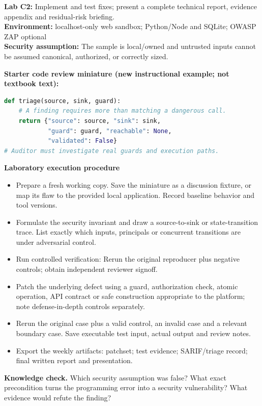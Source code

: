 \documentclass[10pt,letterpaper]{article}
\begin{document}
\begin{insight}\textbf{Lab C2:} Implement and test fixes; present a complete technical report, evidence appendix and residual-risk briefing.\\\textbf{Environment:} localhost-only web sandbox; Python/Node and SQLite; OWASP ZAP optional\\\textbf{Security assumption:} The sample is local/owned and untrusted inputs cannot be assumed canonical, authorized, or correctly sized.\end{insight}
\textbf{Starter code review miniature (new instructional example; not textbook text):}
\begin{lstlisting}[language=Python]
def triage(source, sink, guard):
    # A finding requires more than matching a dangerous call.
    return {"source": source, "sink": sink,
            "guard": guard, "reachable": None,
            "validated": False}
# Auditor must investigate real guards and execution paths.
\end{lstlisting}
\textbf{Laboratory execution procedure}
\begin{itemize}[leftmargin=*,itemsep=2pt]
\item Prepare a fresh working copy. Save the miniature as a discussion fixture, or map its flaw to the provided local application. Record baseline behavior and tool versions.
\item Formulate the security invariant and draw a source-to-sink or state-transition trace. List exactly which inputs, principals or concurrent transitions are under adversarial control.
\item Run controlled verification: Rerun the original reproducer plus negative controls; obtain independent reviewer signoff.
\item Patch the underlying defect using a guard, authorization check, atomic operation, API contract or safe construction appropriate to the platform; note defense-in-depth controls separately.
\item Rerun the original case plus a valid control, an invalid case and a relevant boundary case. Save executable test input, actual output and review notes.
\item Export the weekly artifacts: patchset; test evidence; SARIF/triage record; final written report and presentation.
\end{itemize}
\textbf{Knowledge check.} Which security assumption was false? What exact precondition turns the programming error into a security vulnerability? What evidence would refute the finding?
\end{document}
